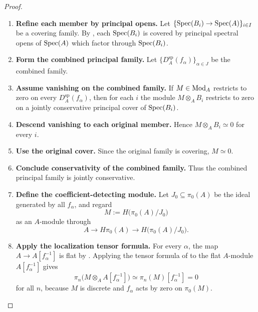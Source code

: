\begin{proof}
\leavevmode
\begin{enumerate}[label=\textup{(\arabic*)}]
    \item \textbf{Refine each member by principal opens.}
    Let \(\{\operatorname{Spec}(B_i)\to\operatorname{Spec}(A)\}_{i\in I}\) be a covering family. By
    , each \(\operatorname{Spec}(B_i)\) is covered by
    principal spectral opens of \(\operatorname{Spec}(A)\) which factor through
    \(\operatorname{Spec}(B_i)\).

    \item \textbf{Form the combined principal family.}
    Let
    \(\{D_A^{\mathrm{sp}}(f_\alpha)\}_{\alpha\in J}\) be the combined
    family.

    \item \textbf{Assume vanishing on the combined family.}
    If \(M\in\operatorname{Mod}_A\) restricts to zero on every
    \(D_A^{\mathrm{sp}}(f_\alpha)\), then for each \(i\) the module
    \(M\otimes_AB_i\) restricts to zero on a jointly conservative principal
    cover of \(\operatorname{Spec}(B_i)\).

    \item \textbf{Descend vanishing to each original member.}
    Hence \(M\otimes_AB_i\simeq0\) for every
    \(i\).

    \item \textbf{Use the original cover.}
    Since the original family is covering, \(M\simeq0\).

    \item \textbf{Conclude conservativity of the combined family.}
    Thus the
    combined principal family is jointly conservative.

    \item \textbf{Define the coefficient-detecting module.}
    Let \(J_0\subseteq\pi_0(A)\) be the ideal generated by all
    \(f_\alpha\), and regard
    \[
        M:=H\bigl(\pi_0(A)/J_0\bigr)
    \]
    as an \(A\)-module through
    \[
        A\longrightarrow H\pi_0(A)
        \longrightarrow H\bigl(\pi_0(A)/J_0\bigr).
    \]

    \item \textbf{Apply the localization tensor formula.}
    For every \(\alpha\), the map
    \(A\to A[f_\alpha^{-1}]\) is flat by
    . Applying the tensor formula of
     to the flat \(A\)-module
    \(A[f_\alpha^{-1}]\) gives
    \[
        \pi_n\bigl(M\otimes_AA[f_\alpha^{-1}]\bigr)
        \simeq
        \pi_n(M)[f_\alpha^{-1}]
        =0
    \]
    for all \(n\), because \(M\) is discrete and \(f_\alpha\) acts by zero
    on \(\pi_0(M)\).


\end{enumerate}
\end{proof}
